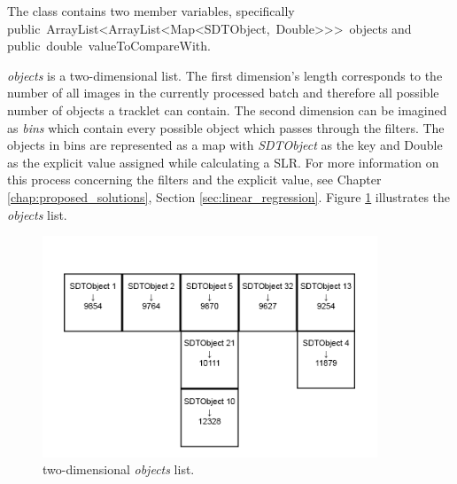 	The class contains two member variables, specifically \newline \mbox{public ArrayList<ArrayList<Map<SDTObject, Double>{}>{}> objects} \newline and \mbox{public double valueToCompareWith}.
	
	\emph{objects} is a two-dimensional list. The first dimension's length corresponds to the number of all images in the currently processed batch and therefore all possible number of objects a tracklet can contain. The second dimension can be imagined as \emph{bins} which contain every possible object which passes through the filters. The objects in bins are represented as a map with \emph{SDTObject} as the key and Double as the explicit value assigned while calculating a SLR. For more information on this process concerning the filters and the explicit value, see Chapter \ref{chap:proposed_solutions}, Section \ref{sec:linear_regression}. Figure \ref{fig:2dbins} illustrates the \emph{objects} list.
	
	\begin{figure}[H]
	\centering
	  \includegraphics[width=10cm]{images/2dbins}
		  \caption{two-dimensional \emph{objects} list.}
	  \label{fig:2dbins}
	\end{figure}

